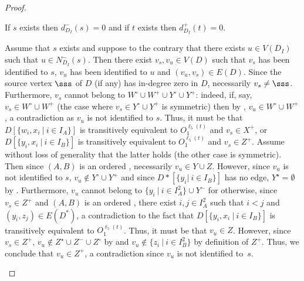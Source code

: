 \begin{proof}
\begin{claim}
\label{clm:sourcesink}
If $s$ exists then $d^-_{D_I}(s) = 0$ and if $t$ exists then $d^+_{D_I}(t) = 0$.
\end{claim}

\begin{claimproof}
Assume that $s$ exists and suppose to the contrary that there exists $u \in V(D_I)$ such that $u \in N^-_{D_I}(s)$.
Then there exist $v_s,v_u \in V(D)$ such that $v_s$ has been identified to $s$, $v_u$ has been identified to $u$ and $(v_u,v_s) \in E(D)$. 
Since the source vertex $\sss$ of $D$ (if any) has in-degree zero in $D$, necessarily $v_s \neq \sss$.
Furthermore, $v_s$ cannot belong to $W^\circ \cup W^+ \cup Y^\circ \cup Y^+$: indeed, if, say, $v_s \in W^\circ \cup W^+$ (the case where $v_s \in Y^\circ \cup Y^+$ is symmetric) then by , $v_u \in W^\circ \cup W^+$, a contradiction as $v_u$ is not identified to $s$.
Thus, it must be that $D[\{w_i,x_i~|~i \in I_A\}]$ is transitively equivalent to $O_1^{\ell_5(t)}$ and $v_s \in X^+$,
or $D[\{y_i,x_i~|~i \in I_B\}]$ is transitively equivalent to $O_1^{\ell_5(t)}$ and $v_s \in Z^+$.
Assume without loss of generality that the latter holds (the other case is symmetric).
Then since $(A,B)$ is an ordered \toughpair, necessarily $v_u \in Y \cup Z$.
However, since $v_u$ is not identified to $s$, $v_u \notin Y^\circ \cup Y^+$ 
and since $D*[\{y_i|~i \in I_B\}]$ has no edge, $Y^\star = \emptyset$ by .
Furthermore, $v_u$ cannot belong to $\{y_i~|~i \in I_A^2\} \cup Y^-$ for otherwise, since $v_s \in Z^+$ and $(A,B)$ is an ordered \toughpair, there exist $i,j \in I_A^2$ such that $i < j$ and $(y_i,z_j) \in E(D^*)$, a contradiction to the fact that $D[\{y_i,x_i~|~i \in I_B\}]$ is transitively equivalent to $O_1^{\ell_5(t)}$.
Thus, it must be that $v_u \in Z$.
However, since $v_s \in Z^+$, $v_u \notin Z^\star \cup Z^- \cup Z^\circ$ by 
and $v_u \notin \{z_i~|~i \in I_B^2\}$ by definition of $Z^+$. 
Thus, we conclude that $v_u \in Z^+$, a contradiction since $v_u$ is not identified to~$s$.


\end{claimproof}
\end{proof}
